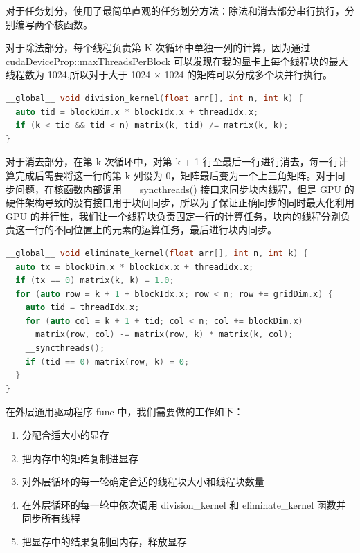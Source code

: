 \documentclass[a4paper]{article}
\begin{document}
对于任务划分，使用了最简单直观的任务划分方法：除法和消去部分串行执行，分别编写两个核函数。

对于除法部分，每个线程负责第 K 次循环中单独一列的计算，因为通过 cudaDeviceProp::maxThreadsPerBlock 可以发现在我的显卡上每个线程块的最大线程数为 1024,所以对于大于 1024 × 1024 的矩阵可以分成多个块并行执行。

\begin{lstlisting}[frame=trbl,language={C++}]
__global__ void division_kernel(float arr[], int n, int k) {
  auto tid = blockDim.x * blockIdx.x + threadIdx.x;
  if (k < tid && tid < n) matrix(k, tid) /= matrix(k, k);
}
\end{lstlisting}

对于消去部分，在第 k 次循环中，对第 k + 1 行至最后一行进行消去，每一行计算完成后需要将这一行的第 k 列设为 0，矩阵最后变为一个上三角矩阵。对于同步问题，在核函数内部调用 \_\_syncthreads() 接口来同步块内线程，但是 GPU 的硬件架构导致的没有接口用于块间同步，所以为了保证正确同步的同时最大化利用 GPU 的并行性，我们让一个线程块负责固定一行的计算任务，块内的线程分别负责这一行的不同位置上的元素的运算任务，最后进行块内同步。

\begin{lstlisting}[frame=trbl,language={C++}]
__global__ void eliminate_kernel(float arr[], int n, int k) {
  auto tx = blockDim.x * blockIdx.x + threadIdx.x;
  if (tx == 0) matrix(k, k) = 1.0;
  for (auto row = k + 1 + blockIdx.x; row < n; row += gridDim.x) {
    auto tid = threadIdx.x;
    for (auto col = k + 1 + tid; col < n; col += blockDim.x)
      matrix(row, col) -= matrix(row, k) * matrix(k, col);
    __syncthreads();
    if (tid == 0) matrix(row, k) = 0;
  }
}
\end{lstlisting}

在外层通用驱动程序 func 中，我们需要做的工作如下：
\begin{enumerate}
  \item 分配合适大小的显存
  \item 把内存中的矩阵复制进显存
  \item 对外层循环的每一轮确定合适的线程块大小和线程块数量
  \item 在外层循环的每一轮中依次调用 division\_kernel 和 eliminate\_kernel 函数并同步所有线程
  \item 把显存中的结果复制回内存，释放显存
\end{enumerate}
\end{document}

